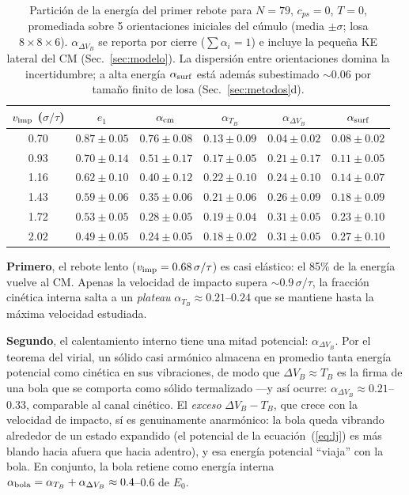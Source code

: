 \documentclass[10pt,a4paper,twocolumn]{article}
\begin{document}
\begin{table}[tp]
\centering
\small
\caption{Partición de la energía del primer rebote para $N=79$,
$c_{ps}=0$, $T=0$, promediada sobre 5 orientaciones iniciales del cúmulo
(media $\pm\sigma$; losa $8\times8\times6$). $\alpha_{\Delta V_B}$ se
reporta por cierre ($\sum\alpha_i=1$) e incluye la pequeña KE lateral del
CM (Sec.~\ref{sec:modelo}). La
dispersión entre orientaciones domina la incertidumbre; a alta energía
$\alpha_{\rm surf}$ está además subestimado $\sim0.06$ por tamaño finito de
losa (Sec.~\ref{sec:metodos}d).}
\label{tab:particion4}
\begin{tabular}{cccccc}
\toprule
$v_{\rm imp}$ ($\sigma/\tau$) & $e_1$ &
$\alpha_{\rm cm}$ & $\alpha_{T_B}$ & $\alpha_{\Delta V_B}$ &
$\alpha_{\rm surf}$ \\
\midrule
0.70 & $0.87\!\pm\!0.05$ & $0.76\!\pm\!0.08$ & $0.13\!\pm\!0.09$ & $0.04\!\pm\!0.02$ & $0.08\!\pm\!0.02$ \\
0.93 & $0.70\!\pm\!0.14$ & $0.51\!\pm\!0.17$ & $0.17\!\pm\!0.05$ & $0.21\!\pm\!0.17$ & $0.11\!\pm\!0.05$ \\
1.16 & $0.62\!\pm\!0.10$ & $0.40\!\pm\!0.12$ & $0.22\!\pm\!0.10$ & $0.24\!\pm\!0.10$ & $0.14\!\pm\!0.07$ \\
1.43 & $0.59\!\pm\!0.06$ & $0.35\!\pm\!0.06$ & $0.21\!\pm\!0.06$ & $0.26\!\pm\!0.09$ & $0.18\!\pm\!0.09$ \\
1.72 & $0.53\!\pm\!0.05$ & $0.28\!\pm\!0.05$ & $0.19\!\pm\!0.04$ & $0.31\!\pm\!0.05$ & $0.23\!\pm\!0.10$ \\
2.02 & $0.49\!\pm\!0.05$ & $0.24\!\pm\!0.05$ & $0.18\!\pm\!0.02$ & $0.31\!\pm\!0.05$ & $0.27\!\pm\!0.10$ \\
\bottomrule
\end{tabular}
\end{table}

\textbf{Primero}, el rebote lento ($v_{\rm imp}=0.68\,\sigma/\tau$) es
casi elástico: el 85\% de la energía vuelve al CM. Apenas la velocidad de
impacto supera $\sim0.9\,\sigma/\tau$, la fracción cinética interna salta
a un \emph{plateau} $\alpha_{T_B}\approx0.21$--$0.24$ que se mantiene
hasta la máxima velocidad estudiada.

\textbf{Segundo}, el calentamiento interno tiene una mitad potencial:
$\alpha_{\Delta V_B}$. Por el teorema del virial, un sólido casi armónico
almacena en promedio tanta energía potencial como cinética en sus
vibraciones, de modo que $\Delta V_B\approx T_B$ es la firma de una bola
que se comporta como sólido termalizado ---y así ocurre:
$\alpha_{\Delta V_B}\approx0.21$--$0.33$, comparable al canal cinético.
El \emph{exceso} $\Delta V_B-T_B$, que crece con la velocidad de impacto,
sí es genuinamente anarmónico: la bola queda vibrando alrededor de un
estado expandido (el potencial de la ecuación~(\ref{eq:lj}) es más blando
hacia afuera que hacia adentro), y esa energía potencial ``viaja'' con la
bola.
En conjunto, la bola retiene como energía interna
$\alpha_{\rm bola}=\alpha_{T_B}+\alpha_{\Delta V_B}\approx0.4$--$0.6$ de
$E_0$.
\end{document}
